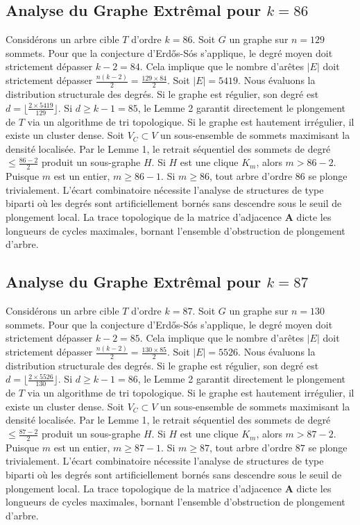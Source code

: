 \documentclass[11pt,a4paper]{article}
\begin{document}
\subsection{Analyse du Graphe Extr\^emal pour $k=86$}
Consid\'erons un arbre cible $T$ d'ordre $k=86$.
Soit $G$ un graphe sur $n=129$ sommets.
Pour que la conjecture d'Erd\H{o}s-S\'os s'applique, le degr\'e moyen doit strictement d\'epasser $k-2 = 84$.
Cela implique que le nombre d'ar\^etes $|E|$ doit strictement d\'epasser $\frac{n(k-2)}{2} = \frac{129 \times 84}{2}$.
Soit $|E| = 5419$.
Nous \'evaluons la distribution structurale des degr\'es. Si le graphe est r\'egulier, son degr\'e est $d = \lfloor \frac{2 \times 5419}{129} \rfloor$.
Si $d \geq k-1 = 85$, le Lemme 2 garantit directement le plongement de $T$ via un algorithme de tri topologique.
Si le graphe est hautement irr\'egulier, il existe un cluster dense. Soit $V_C \subset V$ un sous-ensemble de sommets maximisant la densit\'e localis\'ee.
Par le Lemme 1, le retrait s\'equentiel des sommets de degr\'e $\leq \frac{86-2}{2}$ produit un sous-graphe $H$.
Si $H$ est une clique $K_{m}$, alors $m > 86-2$. Puisque $m$ est un entier, $m \geq 86-1$. Si $m \geq 86$, tout arbre d'ordre $86$ se plonge trivialement.
L'\'ecart combinatoire n\'ecessite l'analyse de structures de type biparti o\`u les degr\'es sont artificiellement born\'es sans descendre sous le seuil de plongement local. La trace topologique de la matrice d'adjacence $\mathbf{A}$ dicte les longueurs de cycles maximales, bornant l'ensemble d'obstruction de plongement d'arbre.


\subsection{Analyse du Graphe Extr\^emal pour $k=87$}
Consid\'erons un arbre cible $T$ d'ordre $k=87$.
Soit $G$ un graphe sur $n=130$ sommets.
Pour que la conjecture d'Erd\H{o}s-S\'os s'applique, le degr\'e moyen doit strictement d\'epasser $k-2 = 85$.
Cela implique que le nombre d'ar\^etes $|E|$ doit strictement d\'epasser $\frac{n(k-2)}{2} = \frac{130 \times 85}{2}$.
Soit $|E| = 5526$.
Nous \'evaluons la distribution structurale des degr\'es. Si le graphe est r\'egulier, son degr\'e est $d = \lfloor \frac{2 \times 5526}{130} \rfloor$.
Si $d \geq k-1 = 86$, le Lemme 2 garantit directement le plongement de $T$ via un algorithme de tri topologique.
Si le graphe est hautement irr\'egulier, il existe un cluster dense. Soit $V_C \subset V$ un sous-ensemble de sommets maximisant la densit\'e localis\'ee.
Par le Lemme 1, le retrait s\'equentiel des sommets de degr\'e $\leq \frac{87-2}{2}$ produit un sous-graphe $H$.
Si $H$ est une clique $K_{m}$, alors $m > 87-2$. Puisque $m$ est un entier, $m \geq 87-1$. Si $m \geq 87$, tout arbre d'ordre $87$ se plonge trivialement.
L'\'ecart combinatoire n\'ecessite l'analyse de structures de type biparti o\`u les degr\'es sont artificiellement born\'es sans descendre sous le seuil de plongement local. La trace topologique de la matrice d'adjacence $\mathbf{A}$ dicte les longueurs de cycles maximales, bornant l'ensemble d'obstruction de plongement d'arbre.
\end{document}

